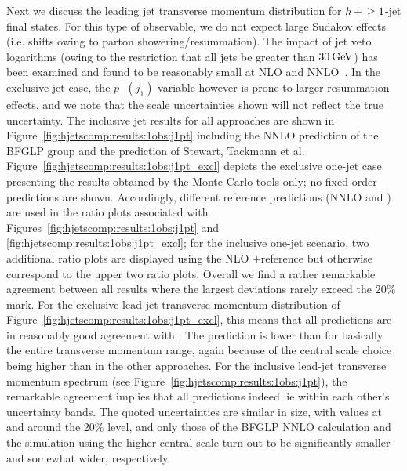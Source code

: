 Next we discuss the leading jet transverse momentum distribution for
$h\!\text{~+~}\!\ge1$-jet final states. For this type of observable, we do not
expect large Sudakov effects (i.e. shifts owing to parton
showering/resummation). The impact of jet veto logarithms (owing to
the restriction that all jets be greater than $30\text{\:GeV}$) has been
examined and found to be reasonably small at NLO and
NNLO~\cite{monni}.  
In the exclusive jet case, the $p_\perp(j_1)$ variable however is
prone to larger resummation effects, and we note that the scale
uncertainties shown will not reflect the true uncertainty. The
inclusive jet results for all approaches are shown in
Figure~\ref{fig:hjetscomp:results:1obs:j1pt} including the NNLO
prediction of the BFGLP group and the prediction of Stewart, Tackmann
et al. Figure~\ref{fig:hjetscomp:results:1obs:j1pt_excl} depicts the
exclusive one-jet case presenting the results obtained by the Monte
Carlo tools only; no fixed-order predictions are shown. Accordingly,
different reference predictions (NNLO and \Powheg) are used in the
ratio plots associated with
Figures~\ref{fig:hjetscomp:results:1obs:j1pt} and
\ref{fig:hjetscomp:results:1obs:j1pt_excl}; for the inclusive one-jet
scenario, two additional ratio plots are displayed using the NLO
\GoSam+\Sherpa reference but otherwise correspond to the upper two
ratio plots.  Overall we find a rather remarkable agreement
between all results where the largest deviations rarely exceed the
20\% mark. For the exclusive lead-jet transverse momentum distribution
of Figure~\ref{fig:hjetscomp:results:1obs:j1pt_excl}, this means that
all predictions are in reasonably good agreement with \Powheg. The
\MGaMC prediction is lower than \Powheg for basically the entire
transverse momentum range, again because of the central scale choice
being higher than in the other approaches. For the inclusive lead-jet
transverse momentum spectrum (see
Figure~\ref{fig:hjetscomp:results:1obs:j1pt}), the remarkable
agreement implies that all predictions indeed lie within each other's
uncertainty bands. The quoted uncertainties are similar in size, with
values at and around the 20\% level, and only those of the BFGLP NNLO
calculation and the \MGaMC simulation using the higher central scale
turn out to be significantly smaller and somewhat wider, respectively.

